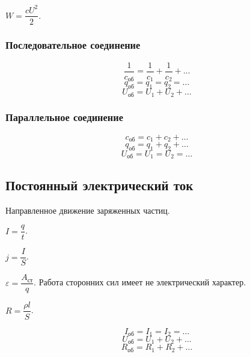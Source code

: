 \documentclass[12pt]{article}
\begin{document}
	\begin{definition}
		$W = \dfrac{c U^2}{2}$.
	\end{definition}
	
	\subsubsection{Последовательное соединение}
	
	$$
	\dfrac{1}{c_{\text{об}}} = \dfrac{1}{c_1} + \dfrac{1}{c_2} + \dots
	$$
	$$
	q_{\text{об}} = q_1 = q_2 = \dots
	$$
	$$
	U_{\text{об}} = U_1 + U_2 + \dots
	$$
	
	\subsubsection{Параллельное соединение}
	
	$$
	c_{\text{об}} = c_1 + c_2 + \dots
	$$
	$$
	q_{\text{об}} = q_1 + q_2 + \dots
	$$
	$$
	U_{\text{об}} = U_1 = U_2 = \dots
	$$
	
	\subsection{Постоянный электрический ток}
	
	\begin{definition}
		Направленное движение заряженных частиц.
	\end{definition}
	
	\begin{definition}
		$I = \dfrac{q}{t}$.
	\end{definition}
	
	\begin{definition}
		$j = \dfrac{I}{S}$.
	\end{definition}
	
	\begin{definition}
		$\varepsilon = \dfrac{A_{\text{ст}}}{q}$. Работа сторонних сил имеет не электрический характер.
	\end{definition}
	
	\begin{definition}
		$R = \dfrac{\rho l}{S}$.
	\end{definition}
	
	\begin{definition}
		\[ I_{\text{об}} = I_{1} = I_{2} = \dots \]
		\[ U_{\text{об}} = U_{1} + U_{2} + \dots \]
		\[ R_{\text{об}} = R_{1} + R_{2} + \dots \]
	\end{definition}
	
\end{document}
